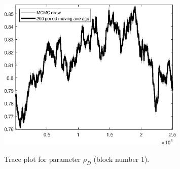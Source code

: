\begin{figure}[H]
\centering
  \includegraphics[width=0.8\textwidth]{BRS_est_shopping/graphs/TracePlot_rho_D_blck_1}\\
    \caption{Trace plot for parameter ${\rho_D}$ (block number 1).}
\end{figure}
